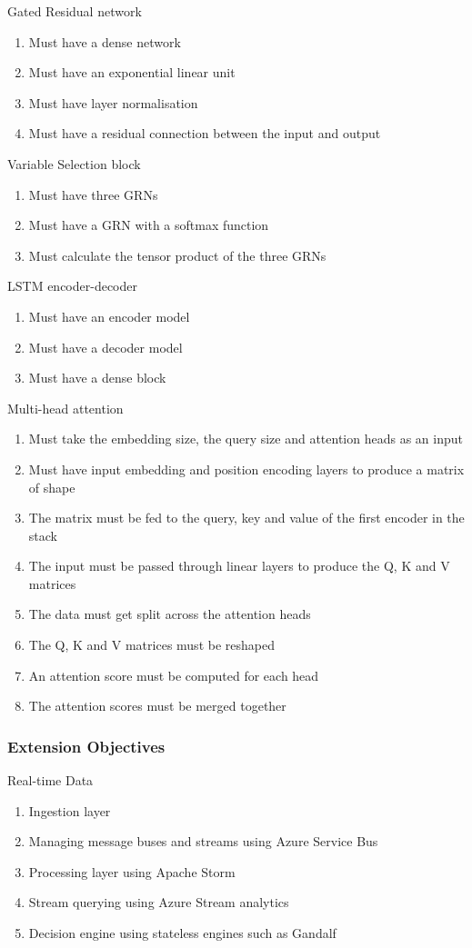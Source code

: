 \documentclass{article}
\begin{document}
Gated Residual network
\begin{enumerate}
    \item Must have a dense network
    \item Must have an exponential linear unit
    \item Must have layer normalisation
    \item Must have a residual connection between the input and output
\end{enumerate}
Variable Selection block
\begin{enumerate}
    \item Must have three GRNs
    \item Must have a GRN with a softmax function
    \item Must calculate the tensor product of the three GRNs
\end{enumerate}
LSTM encoder-decoder
\begin{enumerate}
    \item Must have an encoder model
    \item Must have a decoder model
    \item Must have a dense block
\end{enumerate}
Multi-head attention
\begin{enumerate}
    \item Must take the embedding size, the query size and attention heads as an input
    \item Must have input embedding and position encoding layers to produce a matrix of shape
    \item The matrix must be fed to the query, key and value of the first encoder in the stack
    \item The input must be passed through linear layers to produce the Q, K and V matrices
    \item The data must get split across the attention heads
    \item The Q, K and V matrices must be reshaped
    \item An attention score must be computed for each head
    \item The attention scores must be merged together
\end{enumerate}

\subsubsection{Extension Objectives}
Real-time Data
\begin{enumerate}
    \item Ingestion layer
    \item Managing message buses and streams using Azure Service Bus
    \item Processing layer using Apache Storm
    \item Stream querying using Azure Stream analytics
    \item Decision engine using stateless engines such as Gandalf
\end{enumerate}
\end{document}
